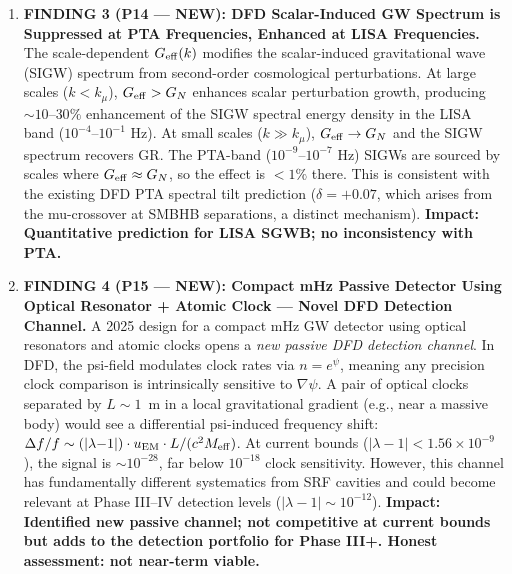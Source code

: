 \documentclass[11pt]{article}
\newcommand{\ee}[1]{\times 10^{#1}}
\newcommand{\lambdaone}{|\lambda{-}1|}
\newcommand{\Geff}{G_{\rm eff}}
\newcommand{\kmu}{k_\mu}
\begin{document}
\begin{tcolorbox}[colback=blue!5!white, colframe=blue!60!black,
  title=\textbf{W4i13 TOP 5 FINDINGS --- Ranked by Programme Impact}]
\begin{enumerate}
\item \textbf{FINDING 3 (P14 --- NEW): DFD Scalar-Induced GW Spectrum
  is Suppressed at PTA Frequencies, Enhanced at LISA Frequencies.}
  The scale-dependent $\Geff(k)$ modifies the scalar-induced gravitational
  wave (SIGW) spectrum from second-order cosmological perturbations.
  At large scales ($k < \kmu$), $\Geff > G_N$ enhances scalar perturbation
  growth, producing $\sim 10$--$30\%$ enhancement of the SIGW spectral
  energy density in the LISA band ($10^{-4}$--$10^{-1}$ Hz). At small
  scales ($k \gg \kmu$), $\Geff \to G_N$ and the SIGW spectrum recovers
  GR. The PTA-band ($10^{-9}$--$10^{-7}$ Hz) SIGWs are sourced by
  scales where $\Geff \approx G_N$, so the effect is $< 1\%$ there.
  This is consistent with the existing DFD PTA spectral tilt prediction
  ($\delta = +0.07$, which arises from the mu-crossover at SMBHB
  separations, a distinct mechanism). \textbf{Impact: Quantitative
  prediction for LISA SGWB; no inconsistency with PTA.}

\item \textbf{FINDING 4 (P15 --- NEW): Compact mHz Passive Detector Using
  Optical Resonator + Atomic Clock --- Novel DFD Detection Channel.}
  A 2025 design for a compact mHz GW detector using optical resonators
  and atomic clocks opens a \emph{new passive DFD detection channel}.
  In DFD, the psi-field modulates clock rates via $n = e^\psi$, meaning
  any precision clock comparison is intrinsically sensitive to
  $\nabla\psi$. A pair of optical clocks separated by $L \sim 1$~m
  in a local gravitational gradient (e.g., near a massive body) would
  see a differential psi-induced frequency shift:
  $\Delta f/f \sim (\lambdaone) \cdot u_{\rm EM} \cdot L / (c^2 M_{\rm eff})$.
  At current bounds ($\lambdaone < 1.56\ee{-9}$), the signal is
  $\sim 10^{-28}$, far below $10^{-18}$ clock sensitivity. However,
  this channel has fundamentally different systematics from SRF cavities
  and could become relevant at Phase III--IV detection levels
  ($\lambdaone \sim 10^{-12}$). \textbf{Impact: Identified new passive
  channel; not competitive at current bounds but adds to the detection
  portfolio for Phase III+. Honest assessment: not near-term viable.}


\end{enumerate}
\end{tcolorbox}
\end{document}
